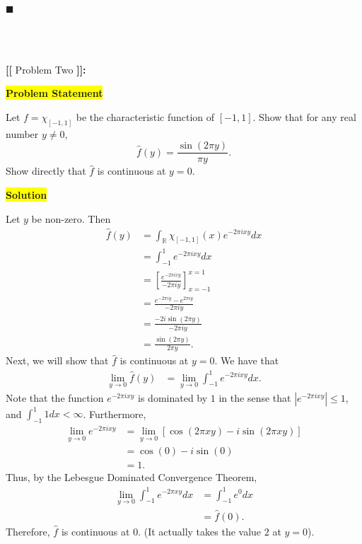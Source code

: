 \documentclass[12pt]{article}
\newcommand{\mybox}{%
    \collectbox{%
        \setlength{\fboxsep}{2pt}%
        \fbox{\BOXCONTENT}%
    }%
}
\begin{document}
\hfill$\blacksquare$

\vfill

\begin{center}
\\
\vspace{2mm}
\vspace{-0.65cm}
\hrulefill \\
\vspace{-0.95cm}
\hrulefill
\end{center}

\pagebreak

\noindent \textbf{{\huge [}{\Large [}} Problem Two \textbf{{\Large ]}{\huge ]}}{\Large \textbf{:}}

\vspace{3mm}

\noindent\mybox{\colorbox{yellow}{\textbf{Problem Statement}}}\hspace{3mm}\hrulefill

\noindent Let $f = \chi_{[-1,1]}$ be the characteristic function of $[-1,1]$. Show that for any real number $y\neq 0$, $$\hat{f}(y) = \frac{\sin(2\pi y)}{\pi y}.$$ Show directly that $\hat{f}$ is continuous at $y=0$. 

\noindent\mybox{\colorbox{yellow}{\textbf{Solution}}}\hspace{3mm}\hrulefill

\noindent Let $y$ be non-zero. Then
\begin{align}
    \hat{f}(y) &= \int_{\mathbb{R}} \chi_{[-1,1]}(x) e^{-2\pi i x y} dx \\
    &= \int_{-1}^1 e^{-2\pi i x y} dx \\
    &= \left[\frac{e^{-2\pi i xy}}{-2\pi iy}\right]_{x=-1}^{x=1} \\
    &= \frac{e^{-2\pi iy}-e^{2\pi iy}}{-2\pi iy} \\
    &=  \frac{-2i\sin(2\pi y)}{-2\pi i y} \\
    &= \frac{\sin(2\pi y)}{2\pi y}.
\end{align}
Next, we will show that $\hat{f}$ is continuous at $y=0.$ We have that
\begin{align}
    \lim\limits_{y \rightarrow 0} \hat{f}(y) &= \lim\limits_{y\rightarrow 0}\int_{-1}^{1} e^{-2\pi i x y} dx.
\end{align} 
Note that the function $e^{-2\pi i xy}$ is dominated by $1$ in the sense that $\left| e^{-2\pi i x y}\right| \leq 1$, and $\int_{-1}^{1} 1 dx < \infty$. Furthermore, 
\begin{align}
    \lim_{y\rightarrow 0} e^{-2\pi ix y} &= \lim_{y\rightarrow 0} \left[\cos(2\pi xy) - i \sin(2\pi xy)\right] \\
    &= \cos(0) - i\sin(0) \\
    &= 1.
\end{align}
Thus, by the Lebesgue Dominated Convergence Theorem,
\begin{align}
    \lim_{y\rightarrow 0} \int_{-1}^{1} e^{-2\pi x y}dx &= \int_{-1}^{1} e^{0} dx \\
    &= \hat{f}(0).
\end{align}
Therefore, $\hat{f}$ is continuous at $0$. (It actually takes the value $2$ at $y=0$).
\end{document}
